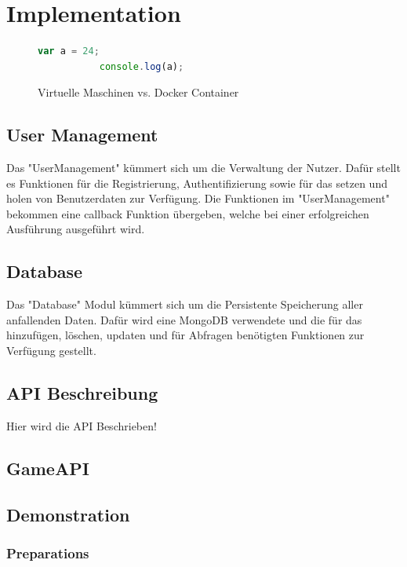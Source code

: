 \documentclass[a4paper]{spie}  %
\begin{document}
\section{Implementation}

\begin{figure}[h!]
	\centering
        \begin{lstlisting}[language=JavaScript,caption=Javascript Example]
           var a = 24;
           console.log(a);
        \end{lstlisting}
		\caption{Virtuelle Maschinen vs. Docker Container\cite{dockercontainer}}
		\label{fig:dockerVM}
\end{figure}

\subsection{User Management}
Das "UserManagement" kümmert sich um die Verwaltung der Nutzer. Dafür stellt es Funktionen für die Registrierung, Authentifizierung sowie für das setzen und holen von Benutzerdaten zur Verfügung. Die Funktionen im "UserManagement" bekommen eine callback Funktion übergeben, welche bei einer erfolgreichen Ausführung ausgeführt wird.

\subsection{Database}
Das "Database" Modul kümmert sich um die Persistente Speicherung aller anfallenden Daten. Dafür wird eine MongoDB verwendete und die für das hinzufügen, löschen, updaten und für Abfragen benötigten Funktionen zur Verfügung gestellt.


\subsection{API Beschreibung}
Hier wird die API Beschrieben!


\subsection{GameAPI}


\subsection{Demonstration}
\subsubsection{Preparations}
\end{document}
